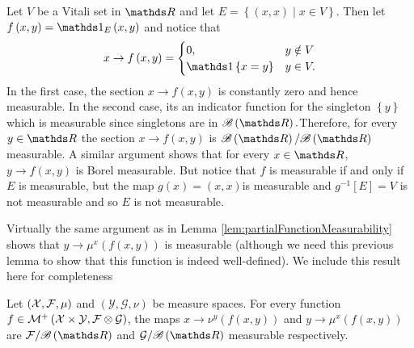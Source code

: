 \begin{example}
\label{exa:sectionMeasurableNotProductMeasurable}Let $V$ be a Vitali
set in $\R$ and let $E=\left\{ \left(x,x\right)\mid x\in V\right\} .$
Then let $f\left(x,y\right)=\indicate_{E}\left(x,y\right)$ and notice
that
\[
x\to f\left(x,y\right)=\begin{cases}
0, & y\notin V\\
\indicate\left\{ x=y\right\}  & y\in V.
\end{cases}
\]
In the first case, the section $x\to f\left(x,y\right)$ is constantly
zero and hence measurable. In the second case, its an indicator function
for the singleton $\left\{ y\right\} $ which is measurable since
singletons are in $\borel\left(\R\right).$Therefore, for every $y\in\R$
the section $x\to f\left(x,y\right)$ is $\borel\left(\R\right)/\borel\left(\R\right)$
measurable. A similar argument shows that for every $x\in\R$, $y\to f\left(x,y\right)$
is Borel measurable. But notice that $f$ is measurable if and only
if $E$ is measurable, but the map $g\left(x\right)=\left(x,x\right)$is
measurable and $g^{-1}\left[E\right]=V$ is not measurable and so
$E$ is not measurable.
\end{example}

Virtually the same argument as in Lemma \ref{lem:partialFunctionMeasurability}
shows that $y\to\mu^{x}\left(f\left(x,y\right)\right)$ is measurable
(although we need this previous lemma to show that this function is
indeed well-defined). We include this result here for completeness
\begin{lem}
\label{lem:partialIntegralMeasurability}Let $\left(\mathcal{X},\mathcal{F},\mu\right)$
and $\left(\mathcal{Y},\mathcal{G},\nu\right)$ be measure spaces.
For every function $f\in\mathcal{M}^{+}\left(\mathcal{X}\times\mathcal{Y},\mathcal{F}\otimes\mathcal{G}\right)$,
the maps $x\to\nu^{y}\left(f\left(x,y\right)\right)$ and $y\to\mu^{x}\left(f\left(x,y\right)\right)$
are $\mathcal{F}/\borel\left(\R\right)$ and $\mathcal{G}/\borel\left(\R\right)$
measurable respectively.
\end{lem}

